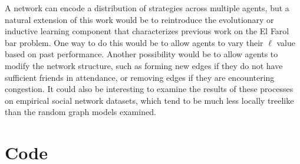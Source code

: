 \documentclass[12pt]{article}
\begin{document}
A network can encode a distribution of strategies across multiple agents, but a natural extension of this work would be to reintroduce the evolutionary or inductive learning component that characterizes previous work on the El Farol bar problem.  One way to do this would be to allow agents to vary their $\ell$ value based on past performance.  Another possibility would be to allow agents to modify the network structure, such as forming new edges if they do not have sufficient friends in attendance, or removing edges if they are encountering congestion.  It could also be interesting to examine the results of these processes on empirical social network datasets, which tend to be much less locally treelike than the random graph models examined.    

\section*{Code}
\end{document}
